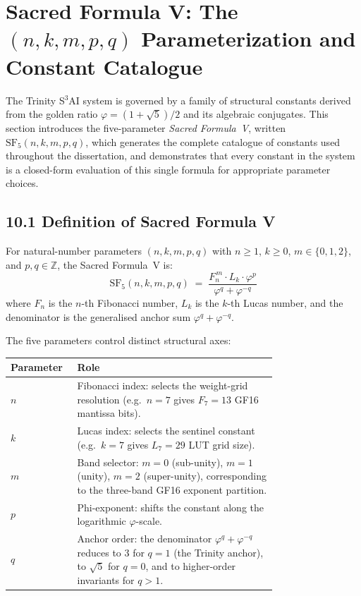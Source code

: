 \section{Sacred Formula V: The $(n,k,m,p,q)$
Parameterization and Constant
Catalogue}\label{fa_29:sacred-formula-v}

The Trinity S$^3$AI system is governed by a family
of structural constants derived from the golden
ratio $\varphi = (1+\sqrt{5})/2$ and its algebraic
conjugates. This section introduces the five-parameter
\emph{Sacred Formula~V}, written
$\mathrm{SF}_5(n,k,m,p,q)$, which generates the
complete catalogue of constants used throughout the
dissertation, and demonstrates that every constant
in the system is a closed-form evaluation of this
single formula for appropriate parameter choices.

\subsection{10.1 Definition of Sacred Formula
V}\label{fa_29:sf5-definition}

\begin{definition}
\label{fa_29:def:sf5}
For natural-number parameters $(n, k, m, p, q)$ with
$n \geq 1$, $k \geq 0$, $m \in \{0,1,2\}$, and
$p, q \in \mathbb{Z}$, the Sacred Formula~V is:
\begin{equation}
\label{eq:sf5}
\mathrm{SF}_5(n,k,m,p,q) \;=\;
\frac{F_n^{\,m} \cdot L_k \cdot \varphi^{p}}{\varphi^{q} + \varphi^{-q}}
\end{equation}
where $F_n$ is the $n$-th Fibonacci number, $L_k$
is the $k$-th Lucas number, and the denominator is
the generalised anchor sum
$\varphi^{q}+\varphi^{-q}$.
\end{definition}

The five parameters control distinct structural
axes:

\begin{longtable}[]{@{}lp{0.75\linewidth}@{}}
\toprule\noalign{}
Parameter & Role \\
\midrule\noalign{}
\endhead
\bottomrule\noalign{}
\endlastfoot
$n$ & Fibonacci index: selects the weight-grid
resolution (e.g.\ $n=7$ gives $F_7=13$ GF16
mantissa bits). \\
$k$ & Lucas index: selects the sentinel constant
(e.g.\ $k=7$ gives $L_7=29$ LUT grid size). \\
$m$ & Band selector: $m=0$ (sub-unity),
$m=1$ (unity), $m=2$ (super-unity), corresponding
to the three-band GF16 exponent partition. \\
$p$ & Phi-exponent: shifts the constant along the
logarithmic $\varphi$-scale. \\
$q$ & Anchor order: the denominator
$\varphi^{q}+\varphi^{-q}$ reduces to $3$ for
$q=1$ (the Trinity anchor), to $\sqrt{5}$ for
$q=0$, and to higher-order invariants for $q>1$. \\
\end{longtable}

